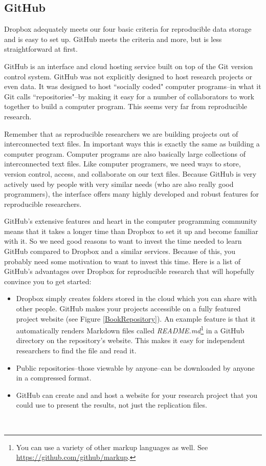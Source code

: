 \subsection{GitHub}

Dropbox adequately meets our four basic criteria for reproducible data storage and is easy to set up. GitHub meets the criteria and more, but is less straightforward at first.

GitHub is an interface and cloud hosting service built on top of the Git version control system. GitHub was not explicitly designed to host research projects or even data. It was designed to host ``socially coded" computer programs--in what it Git calls ``repositories"--by making it easy for a number of collaborators to work together to build a computer program. This seems very far from reproducible research.

Remember that as reproducible researchers we are building projects out of interconnected text files. In important ways this is exactly the same as building a computer program. Computer programs are also basically large collections of interconnected text files. Like computer programers, we need ways to store, version control, access, and collaborate on our text files. Because GitHub is very actively used by people with very similar needs (who are also really good programmers), the interface offers many highly developed and robust features for reproducible researchers.

GitHub's extensive features and heart in the computer programming community means that it takes a longer time than Dropbox to set it up and become familiar with it. So we need good reasons to want to invest the time needed to learn GitHub compared to Dropbox and a similar services. Because of this, you probably need some motivation to want to invest this time. Here is a list of GitHub's advantages over Dropbox for reproducible research that will hopefully convince you to get started: \\[0.25cm]

\begin{itemize}
    \item Dropbox simply creates folders stored in the cloud which you can share with other people. GitHub makes your projects accessible on a fully featured project website (see Figure \ref{BookRepository}). An example feature is that it automatically renders Markdown files called {\emph{README.md}}\footnote{You can use a variety of other markup languages as well. See \url{https://github.com/github/markup}.} in a GitHub directory on the repository's website. This makes it easy for independent researchers to find the file and read it.   
    \item Public repositories--those viewable by anyone--can be downloaded by anyone in a compressed format.
    \item GitHub can create and and host a website for your research project that you could use to present the results, not just the replication files.
\end{itemize} \\[0.25cm]


